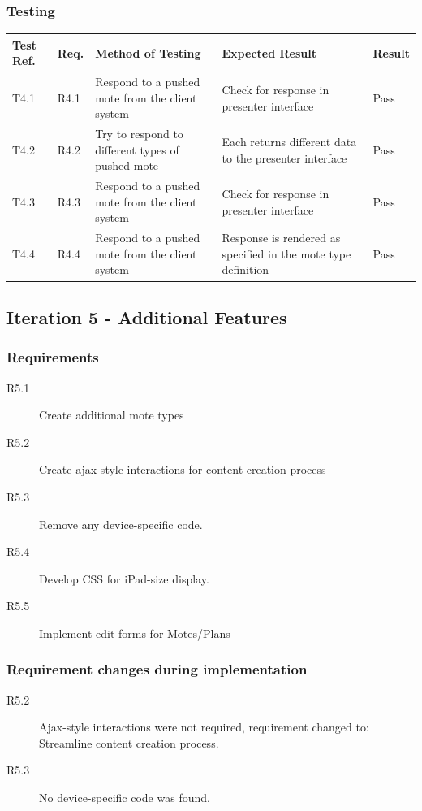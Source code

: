 \documentclass[a4papert,11pt,notitlepage]{article}
\begin{document}
\begin{appendices}
\subsubsection{Testing}
\begin{tabular}{p{30pt} | p{25pt} | p{140pt} | p{140pt} || p{90pt}}
Test Ref. & Req. & Method of Testing & Expected Result & Result \\ \hline
T4.1 & R4.1 & Respond to a pushed mote from the client system & Check for response in presenter interface & Pass \\
T4.2 & R4.2 & Try to respond to different types of pushed mote & Each returns different data to the presenter interface & Pass \\
T4.3 & R4.3 & Respond to a pushed mote from the client system & Check for response in presenter interface & Pass \\
T4.4 & R4.4 & Respond to a pushed mote from the client system & Response is rendered as specified in the mote type definition & Pass \\
\end{tabular}

\subsection{Iteration 5 - Additional Features}
\subsubsection{Requirements}
\begin{description}
\item[R5.1] Create additional mote types
\item[R5.2] Create ajax-style interactions for content creation process
\item[R5.3] Remove any device-specific code.
\item[R5.4] Develop CSS for iPad-size display.
\item[R5.5] Implement edit forms for Motes/Plans
\end{description}

\subsubsection{Requirement changes during implementation}
\begin{description}
\item[R5.2] Ajax-style interactions were not required, requirement changed to: Streamline content creation process.
\item[R5.3] No device-specific code was found.
\end{description}


\end{appendices}
\end{document}
